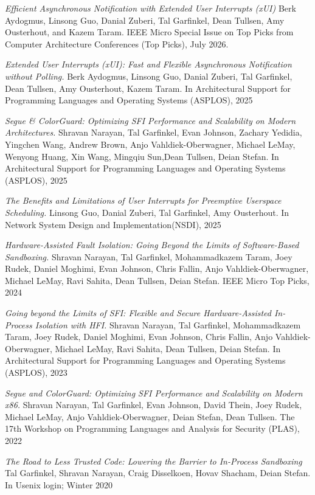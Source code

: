 \begin{resume}
{\it Efficient Asynchronous Notification with Extended User Interrupts (xUI)}
Berk Aydogmus, Linsong Guo, Danial Zuberi, Tal Garfinkel, Dean Tullsen, Amy
Ousterhout, and Kazem Taram. IEEE Micro Special Issue on Top Picks from
Computer Architecture Conferences (Top Picks), July 2026.

{\em Extended User Interrupts (xUI): Fast and Flexible Asynchronous
Notification without Polling.} Berk Aydogmus, Linsong Guo, Danial Zuberi, Tal
Garfinkel, Dean Tullsen, Amy Ousterhout, Kazem Taram.  In Architectural Support
for Programming Languages and Operating Systems (ASPLOS), 2025

{\em Segue \& ColorGuard: Optimizing SFI Performance and Scalability on Modern
Architectures.} Shravan Narayan, Tal Garfinkel, Evan Johnson, Zachary Yedidia,
Yingchen  Wang, Andrew Brown, Anjo Vahldiek-Oberwagner, Michael LeMay, Wenyong
Huang, Xin Wang, Mingqiu Sun,Dean Tullsen, Deian Stefan. In
Architectural Support for Programming Languages and Operating Systems (ASPLOS),
2025

{\em The Benefits and Limitations of User Interrupts for Preemptive Userspace
Scheduling.} Linsong Guo, Danial Zuberi, Tal Garfinkel, Amy Ousterhout.
In Network System Design and Implementation(NSDI), 2025

{\em Hardware-Assisted Fault Isolation: Going Beyond the Limits of
Software-Based Sandboxing.} Shravan Narayan, Tal Garfinkel, Mohammadkazem
Taram, Joey Rudek, Daniel Moghimi, Evan Johnson, Chris Fallin, Anjo
Vahldiek-Oberwagner, Michael LeMay, Ravi Sahita, Dean Tullsen, Deian Stefan.
IEEE Micro Top Picks, 2024

\pagebreak

{\em Going beyond the Limits of SFI: Flexible and Secure Hardware-Assisted
In-Process Isolation with HFI.} Shravan Narayan, Tal Garfinkel, Mohammadkazem
Taram, Joey Rudek, Daniel Moghimi, Evan Johnson, Chris Fallin, Anjo Vahldiek-Oberwagner,
Michael LeMay, Ravi Sahita, Dean Tullsen, Deian Stefan.  In
Architectural Support for Programming Languages and Operating Systems (ASPLOS),
2023

{\em Segue and ColorGuard: Optimizing SFI Performance and Scalability on Modern
x86.} Shravan Narayan, Tal Garfinkel, Evan Johnson, David Thein, Joey Rudek,
Michael LeMay, Anjo Vahldiek-Oberwagner, Deian Stefan, Dean Tullsen. The 17th
Workshop on Programming Languages and Analysis for Security (PLAS), 2022

{\em The Road to Less Trusted Code: Lowering the Barrier to In-Process
Sandboxing} Tal Garfinkel, Shravan Narayan, Craig Disselkoen, Hovav Shacham,
Deian Stefan. In Usenix login; Winter 2020


\end{resume}
